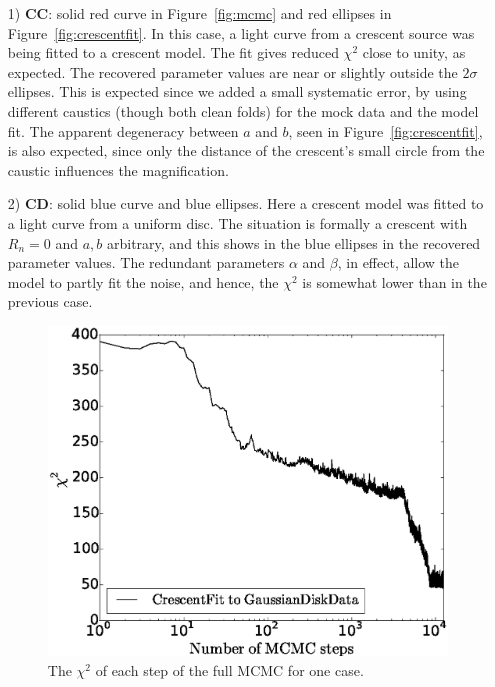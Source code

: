 \documentclass[usenatbib]{mn2e}
\begin{document}
\begin{enumerate}

\item[1) {\bf CC}:] solid red curve in Figure~\ref{fig:mcmc} and red
  ellipses in Figure~\ref{fig:crescentfit}.  In this case, a light
  curve from a crescent source was being fitted to a crescent model.
  The fit gives reduced $\chi^2$ close to unity, as expected.  The
  recovered parameter values are near or slightly outside the
  $2\sigma$ ellipses.  This is expected since we added a small
  systematic error, by using different caustics (though both clean
  folds) for the mock data and the model fit.  The apparent degeneracy
  between $a$ and $b$, seen in Figure~\ref{fig:crescentfit}, is also
  expected, since only the distance of the crescent's small circle
  from the caustic influences the magnification.


\item[2) {\bf CD}:] solid blue curve and blue ellipses.  Here a
  crescent model was fitted to a light curve from a uniform disc.  The
  situation is formally a crescent with $R_n=0$ and $a,b$ arbitrary,
  and this shows in the blue ellipses in the recovered parameter
  values.  The redundant parameters $\alpha$ and $\beta$, in effect, allow the
  model to partly fit the noise, and hence, the $\chi^2$ is somewhat
  lower than in the previous case.

\begin{figure}
\centering
\includegraphics[width=0.9\hsize]{figures/burnin_cg.eps}
\caption{\label{fig:burnin} The $\chi^2$ of each step of the full MCMC
  for one case.}
\end{figure}


\end{enumerate}
\end{document}
